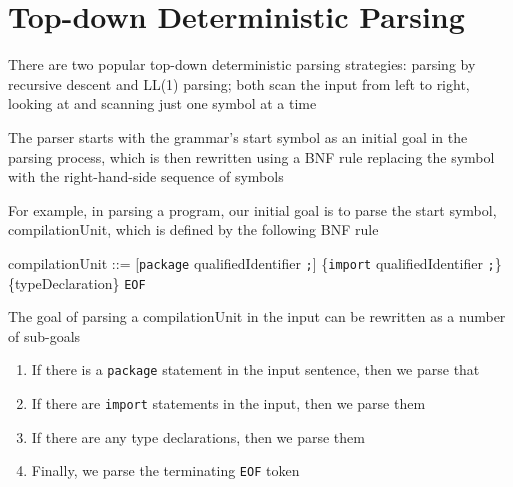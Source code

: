 \documentclass[8pt,a4paper,compress,handout]{beamer}
\newenvironment{spaced}
{
\smallskip
\hspace{.5cm}
\begin{minipage}[c]{\textwidth}
}
{
\end{minipage}
\smallskip
}
\begin{document}
\section{Top-down Deterministic Parsing}
\begin{frame}[fragile]
\pause

There are two popular top-down deterministic parsing strategies: parsing by recursive descent and LL(1) parsing; both scan the input from left to right, looking at and scanning just one symbol at a time

\pause
\bigskip

The parser starts with the grammar's start symbol as an initial goal in the parsing process, which is then rewritten using a BNF rule replacing the symbol with the right-hand-side sequence of symbols

\pause
\bigskip

For example, in parsing a \jmm program, our initial goal is to parse the start symbol, compilationUnit, which is defined by the following BNF rule

\text{ }
\begin{spaced}
\begin{production}
compilationUnit ::= [\lstinline{package} qualifiedIdentifier \lstinline{;}]
                           \{\lstinline{import}  qualifiedIdentifier \lstinline{;}\}
                           \{typeDeclaration\} \lstinline{EOF}
\end{production}
\end{spaced}

\pause
\bigskip

The goal of parsing a compilationUnit in the input can be rewritten as a number of sub-goals

\begin{enumerate}
\item If there is a \lstinline{package} statement in the input sentence, then we parse that
\item If there are \lstinline{import} statements in the input, then we parse them
\item If there are any type declarations, then we parse them
\item Finally, we parse the terminating \lstinline{EOF} token
\end{enumerate}
\end{frame}
\end{document}
